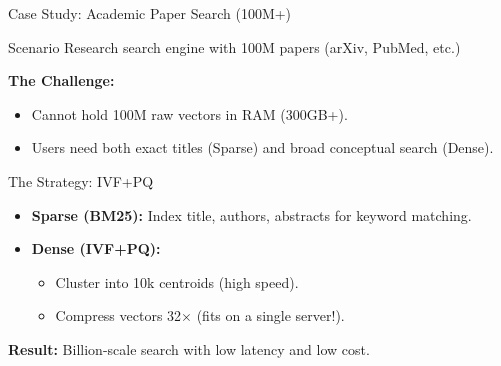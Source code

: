 \documentclass[aspectratio=169]{beamer}
\newif\ifanimated
\newcommand{\cpause}{\ifanimated\pause\fi}
\begin{document}
\begin{frame}[shrink=10]{Case Study: Academic Paper Search (100M+)}
\begin{exampleblock}{Scenario}
Research search engine with 100M papers (arXiv, PubMed, etc.)
\end{exampleblock}
\cpause

\textbf{The Challenge:}
\begin{itemize}
    \item Cannot hold 100M raw vectors in RAM (300GB+).
    \item Users need both exact titles (Sparse) and broad conceptual search (Dense).
\end{itemize}

\begin{block}{The Strategy: IVF+PQ}
\begin{itemize}
    \item \textbf{Sparse (BM25):} Index title, authors, abstracts for keyword matching.
    \item \textbf{Dense (IVF+PQ):} 
        \begin{itemize}
            \item Cluster into 10k centroids (high speed).
            \item Compress vectors 32$\times$ (fits on a single server!).
        \end{itemize}
\end{itemize}
\end{block}
\cpause

\textbf{Result:} Billion-scale search with low latency and low cost.
\end{frame}

\end{document}
